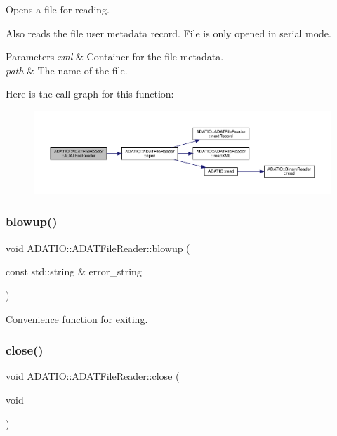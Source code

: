 Opens a file for reading. 

Also reads the file user metadata record. File is only opened in serial mode. 
\begin{DoxyParams}{Parameters}
{\em xml} & Container for the file metadata. \\
\hline
{\em path} & The name of the file. \\
\hline
\end{DoxyParams}
Here is the call graph for this function\+:\nopagebreak
\begin{figure}[H]
\begin{center}
\leavevmode
\includegraphics[width=350pt]{db/de5/group__qio_ga096a7060d69fd109067404e75f8a06ee_cgraph}
\end{center}
\end{figure}
\mbox{\label{group__qio_gaddf83cb612ce869fe7a0a5f7e559fe72}} 
\subsubsection{\texorpdfstring{blowup()}{blowup()}}
{\footnotesize\ttfamily void A\+D\+A\+T\+I\+O\+::\+A\+D\+A\+T\+File\+Reader\+::blowup (\begin{DoxyParamCaption}\item[{const std\+::string \&}]{error\+\_\+string }\end{DoxyParamCaption})\hspace{0.3cm}{\ttfamily [protected]}}



Convenience function for exiting. 

\mbox{\label{group__qio_ga8b86dba1600272d26539815146f04078}} 
\subsubsection{\texorpdfstring{close()}{close()}\hspace{0.1cm}{\footnotesize\ttfamily [1/2]}}
{\footnotesize\ttfamily void A\+D\+A\+T\+I\+O\+::\+A\+D\+A\+T\+File\+Reader\+::close (\begin{DoxyParamCaption}\item[{void}]{ }\end{DoxyParamCaption})}



